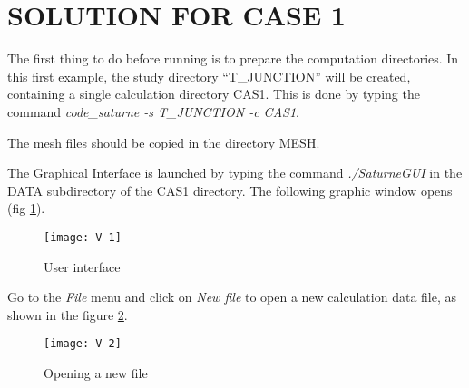 %
%
%
%
%
%
%
\section{SOLUTION FOR CASE 1}
The first thing to do before running \CS is to prepare the computation
directories. In this first example, the study directory ``T\_JUNCTION'' will be
created, containing a single calculation directory CAS1. This is done by typing
the command {\itshape code\_saturne -s T\_JUNCTION -c CAS1}.

The mesh files should be copied in the directory MESH.

The \CS Graphical Interface is launched by typing the command
{\itshape ./SaturneGUI} in the DATA subdirectory of the CAS1 directory.
The following graphic window opens (fig \ref{fig1_e1}).

\begin{figure}[ht]
\begin{center}
\texttt{[image: V-1]}
\caption{User interface}
\label{fig1_e1}
\end{center}
\end{figure}


\clearpage
Go to the {\itshape File} menu and click on {\itshape New file} to open a new
calculation data file, as shown in the figure
\ref{fig2_e1}.

\begin{figure}[ht]
\begin{center}
\texttt{[image: V-2]}
\caption{Opening a new file}
\label{fig2_e1}
\end{center}
\end{figure}


